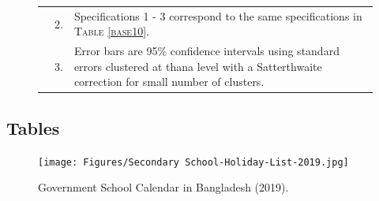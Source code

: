 \documentclass[12pt,letterpaper]{article}
\newcommand{\0}{\ensuremath{\mbox{\boldmath $0$}}}
\begin{document}
{\begin{figure}
\begin{tabular}{>{\hfill\scriptsize}p{1cm}<{}>{\hfill\scriptsize}p{.5cm}<{}>{\scriptsize}p{11cm}<{\hfill}}
& 2. & Specifications 1 - 3 correspond to the same specifications in \textsc{Table \ref{base10}}. \\[-1ex]
& 3. & Error bars are 95\% confidence intervals using standard errors clustered at thana level with a Satterthwaite correction for small number of clusters.
\end{tabular}
\end{figure}

\clearpage
\subsection{Tables}


\begin{figure}[ht!]
\centering
\texttt{[image: Figures/Secondary School-Holiday-List-2019.jpg]}\\
\caption{Government School Calendar in Bangladesh (2019).\protect\footnotemark}
\label{school_calander_2019}
\end{figure}


\pagebreak

}
\end{document}
